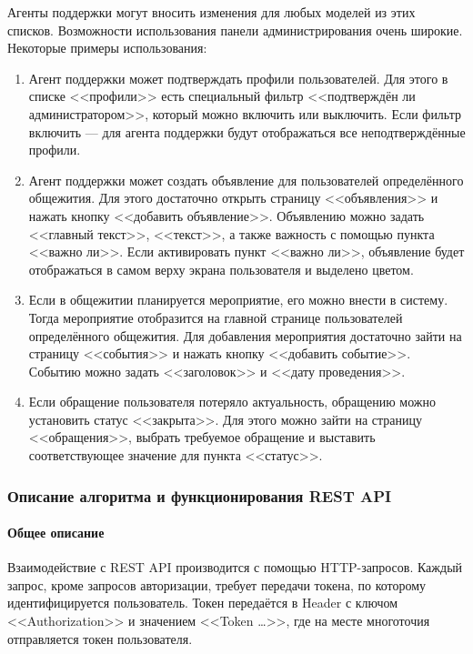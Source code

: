\documentclass{../includes/TechDoc}
\begin{document}
    Агенты поддержки могут вносить изменения для любых моделей из этих списков.
    Возможности использования панели администрирования очень широкие.\\

    Некоторые примеры использования:
    \begin{enumerate}
        \item Агент поддержки может подтверждать профили пользователей.
        Для этого в списке <<профили>> есть специальный фильтр <<подтверждён ли администратором>>, который можно включить
        или выключить.
        Если фильтр включить — для агента поддержки будут отображаться все неподтверждённые профили.
        \item Агент поддержки может создать объявление для пользователей определённого общежития.
        Для этого достаточно открыть страницу <<объявления>> и нажать кнопку <<добавить объявление>>.
        Объявлению можно задать <<главный текст>>, <<текст>>, а также важность с помощью пункта <<важно ли>>.
        Если активировать пункт <<важно ли>>, объявление будет отображаться в самом верху экрана пользователя и выделено цветом.
        \item Если в общежитии планируется мероприятие, его можно внести в систему.
        Тогда мероприятие отобразится на главной странице пользователей определённого общежития.
        Для добавления мероприятия достаточно зайти на страницу <<события>> и нажать кнопку <<добавить событие>>.
        Событию можно задать <<заголовок>> и <<дату проведения>>.
        \item Если обращение пользователя потеряло актуальность, обращению можно установить статус <<закрыта>>.
        Для этого можно зайти на страницу <<обращения>>, выбрать требуемое обращение и выставить соответствующее значение
        для пункта <<статус>>.
    \end{enumerate}

    \clearpage

    \subsubsection{Описание алгоритма и функционирования REST API}

    \paragraph{Общее описание}

    Взаимодействие с REST API производится с помощью HTTP-запросов.
    Каждый запрос, кроме запросов авторизации, требует передачи токена, по которому идентифицируется пользователь.
    Токен передаётся в Header с ключом <<Authorization>> и значением <<Token \ldots>>, где на месте многоточия
    отправляется токен пользователя.\\
\end{document}
